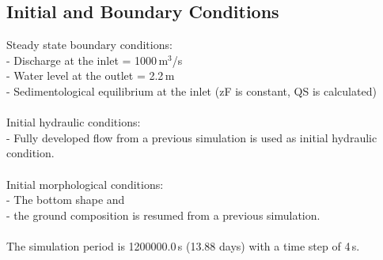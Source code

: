 \subsection{Initial and Boundary Conditions}
Steady state boundary conditions:\\
\hspace*{3mm} - Discharge at the inlet = 1000\,m$^3$/s\\
\hspace*{3mm} - Water level at the outlet = 2.2\,m\\
\hspace*{3mm} - Sedimentological equilibrium at the inlet (zF is constant, QS is calculated)\\
\\
Initial hydraulic conditions:\\
\hspace*{3mm} - Fully developed flow from a previous simulation is used as initial hydraulic condition.\\
\\
Initial morphological conditions:\\
\hspace*{3mm} - The bottom shape and\\
\hspace*{3mm} - the ground composition is resumed from a previous simulation.\\
\\
The simulation period is 1200000.0\,s (13.88 days) with a time step of 4\,s.


